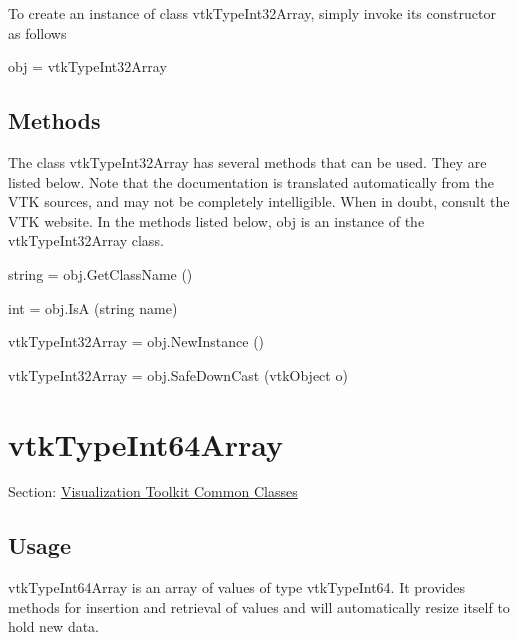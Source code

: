To create an instance of class vtk\-Type\-Int32\-Array, simply invoke its constructor as follows \begin{DoxyVerb}  obj = vtkTypeInt32Array
\end{DoxyVerb}
 \hypertarget{vtkwidgets_vtkxyplotwidget_Methods}{}\subsection{Methods}\label{vtkwidgets_vtkxyplotwidget_Methods}
The class vtk\-Type\-Int32\-Array has several methods that can be used. They are listed below. Note that the documentation is translated automatically from the V\-T\-K sources, and may not be completely intelligible. When in doubt, consult the V\-T\-K website. In the methods listed below, {\ttfamily obj} is an instance of the vtk\-Type\-Int32\-Array class. 
\begin{DoxyItemize}
\item {\ttfamily string = obj.\-Get\-Class\-Name ()}  
\item {\ttfamily int = obj.\-Is\-A (string name)}  
\item {\ttfamily vtk\-Type\-Int32\-Array = obj.\-New\-Instance ()}  
\item {\ttfamily vtk\-Type\-Int32\-Array = obj.\-Safe\-Down\-Cast (vtk\-Object o)}  
\end{DoxyItemize}\hypertarget{vtkcommon_vtktypeint64array}{}\section{vtk\-Type\-Int64\-Array}\label{vtkcommon_vtktypeint64array}
Section\-: \hyperlink{sec_vtkcommon}{Visualization Toolkit Common Classes} \hypertarget{vtkwidgets_vtkxyplotwidget_Usage}{}\subsection{Usage}\label{vtkwidgets_vtkxyplotwidget_Usage}
vtk\-Type\-Int64\-Array is an array of values of type vtk\-Type\-Int64. It provides methods for insertion and retrieval of values and will automatically resize itself to hold new data.

